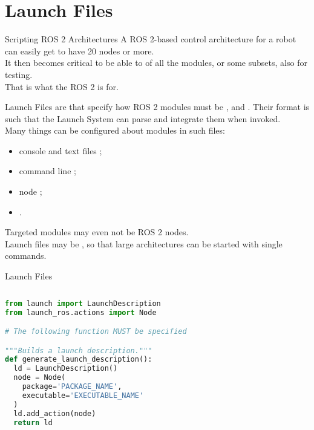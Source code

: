
\section{Launch Files}

\begin{frame}{Scripting ROS 2 Architectures}
A ROS 2-based control architecture for a robot can easily get to have 20 nodes or more.\\\vspace{10pt}
It then becomes critical to be able to  of all the modules, or some subsets, also for testing.\\\vspace{10pt}
That is what the ROS 2  is for.
\end{frame}

\begin{frame}{Launch Files}
 are  that specify how ROS 2 modules must be ,  and . Their format is such that the Launch System can parse and integrate them when invoked.\\\vspace{10pt}
Many things can be configured about modules in such files:
\begin{itemize}
  \item console and text files ;
  \item command line ;
  \item node ;
  \item {}.
\end{itemize}
\vspace{10pt}
Targeted modules may even not be ROS 2 nodes.\\\vspace{10pt}
Launch files may be , so that large architectures can be started with single commands.
\end{frame}
\begin{frame}[fragile]{Launch Files}
\begin{columns}
\begin{lstlisting}[language=Python, caption=Minimal example of a launch file]
from launch import LaunchDescription
from launch_ros.actions import Node

# The following function MUST be specified

"""Builds a launch description."""
def generate_launch_description():
  ld = LaunchDescription()
  node = Node(
    package='PACKAGE_NAME',
    executable='EXECUTABLE_NAME'
  )
  ld.add_action(node)
  return ld
\end{lstlisting}
\end{columns}
\end{frame}

